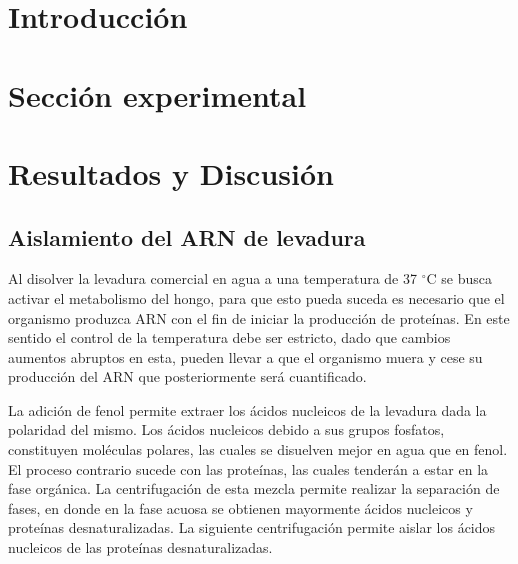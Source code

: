 \documentclass[fleqn,10pt]{SelfArx}
\begin{document}
\flushbottom %

\maketitle %

\thispagestyle{empty} %




\section*{Introducci\'on} %
	
\section{Secci\'on experimental}
	
\section{Resultados y Discusi\'on}
	\subsection{Aislamiento del ARN de levadura}
		Al disolver la levadura comercial en agua a una temperatura de 37 $^\circ$C se busca activar el metabolismo del hongo, para que esto pueda suceda es necesario que el organismo produzca ARN con el fin de iniciar la producci\'on de prote\'inas. En este sentido el control de la temperatura debe ser estricto, dado que cambios aumentos abruptos en esta, pueden llevar a que el organismo muera y cese su producci\'on del ARN que posteriormente ser\'a cuantificado.
		
		La adici\'on de fenol permite extraer los \'acidos nucleicos de la levadura dada la polaridad del mismo. Los \'acidos nucleicos debido a sus grupos fosfatos, constituyen mol\'eculas polares, las cuales se disuelven mejor en agua que en fenol. El proceso contrario sucede con las prote\'inas, las cuales tender\'an a estar en la fase org\'anica. La centrifugaci\'on de esta mezcla permite realizar la separaci\'on de fases, en donde en la fase acuosa se obtienen mayormente \'acidos nucleicos y prote\'inas desnaturalizadas. La siguiente centrifugaci\'on permite aislar los \'acidos nucleicos de las prote\'inas desnaturalizadas.
		
\end{document}
